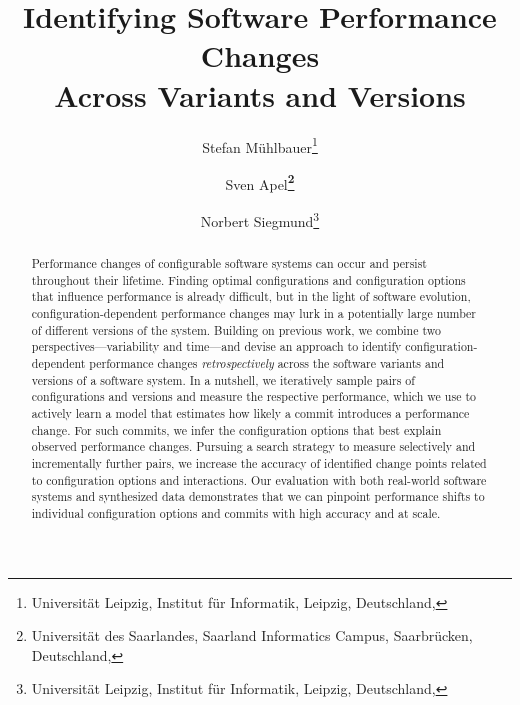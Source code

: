 \documentclass[utf8,biblatex]{lni}
\begin{document}
\title[Identifying Software Performance Changes Across Variants and Versions]{Identifying Software Performance Changes\\ Across Variants and Versions}
\author[Stefan Mühlbauer \and Sven Apel \and Norbert Siegmund]
{Stefan Mühlbauer\footnote{Universität Leipzig, Institut für Informatik, Leipzig, Deutschland, } \and
Sven Apel\textbf{\footnote{Universität des Saarlandes, Saarland Informatics Campus, Saarbrücken, Deutschland, }} \and
Norbert Siegmund\footnote{Universität Leipzig, Institut für Informatik, Leipzig, Deutschland, }
}
\maketitle

\begin{abstract}
Performance changes of configurable software systems can occur and persist throughout their lifetime. Finding optimal configurations and configuration options that influence performance is already difficult, but in the light of software evolution, configuration-dependent performance changes may lurk in a potentially large number of different versions of the system. Building on previous work, we combine two perspectives---variability and time---and devise an approach to identify configuration-dependent performance changes \textit{retrospectively} across the software variants and versions of a software system. In a nutshell, we iteratively sample pairs of configurations and versions and measure the respective performance, which we use to actively learn a model that estimates how likely a commit introduces a performance change. For such commits, we infer the configuration options that best explain observed performance changes. Pursuing a search strategy to measure selectively and incrementally further pairs, we increase the accuracy of identified change points related to configuration options and interactions. Our evaluation with both real-world software systems and synthesized data demonstrates that we can pinpoint performance shifts to individual configuration options and commits with high accuracy and at scale.
\end{abstract}
\end{document}
